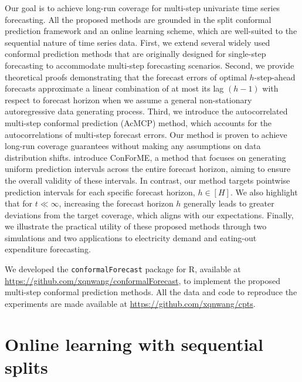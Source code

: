 \documentclass[
  11pt,
  12pt]{article}
\theoremstyle{plain}
\theoremstyle{remark}
\begin{document}
Our goal is to achieve long-run coverage for multi-step univariate time
series forecasting. All the proposed methods are grounded in the split
conformal prediction framework and an online learning scheme, which are
well-suited to the sequential nature of time series data. First, we
extend several widely used conformal prediction methods that are
originally designed for single-step forecasting to accommodate
multi-step forecasting scenarios. Second, we provide theoretical proofs
demonstrating that the forecast errors of optimal \(h\)-step-ahead
forecasts approximate a linear combination of at most its lag \((h-1)\)
with respect to forecast horizon when we assume a general non-stationary
autoregressive data generating process. Third, we introduce the
autocorrelated multi-step conformal prediction (AcMCP) method, which
accounts for the autocorrelations of multi-step forecast errors. Our
method is proven to achieve long-run coverage guarantees without making
any assumptions on data distribution shifts. \citet{lopes2024} introduce
ConForME, a method that focuses on generating uniform prediction
intervals across the entire forecast horizon, aiming to ensure the
overall validity of these intervals. In contrast, our method targets
pointwise prediction intervals for each specific forecast horizon,
\(h\in[H]\). We also highlight that for \(t \ll \infty\), increasing the
forecast horizon \(h\) generally leads to greater deviations from the
target coverage, which aligns with our expectations. Finally, we
illustrate the practical utility of these proposed methods through two
simulations and two applications to electricity demand and eating-out
expenditure forecasting.

We developed the \texttt{conformalForecast} package for R, available at
\url{https://github.com/xqnwang/conformalForecast}, to implement the
proposed multi-step conformal prediction methods. All the data and code
to reproduce the experiments are made available at
\url{https://github.com/xqnwang/cpts}.

\section{Online learning with sequential splits}\label{sec-setup}
\end{document}
